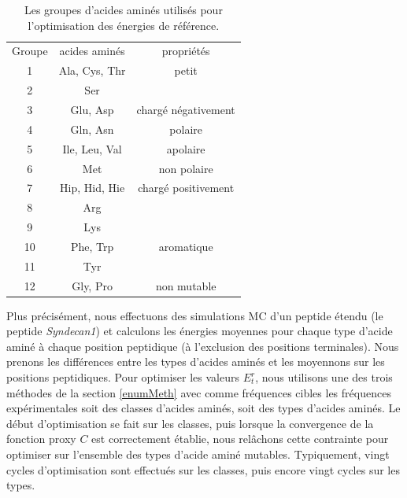     \begin{table}[!htbp]
      \centering

      \begin{tabular}{ccc}

        \toprule
        Groupe & acides aminés & propriétés\\
        \cmidrule{1-3}

        1   & Ala, Cys, Thr & petit\\
        2   & Ser &\\
        \cmidrule{1-3}
        3   & Glu, Asp & chargé négativement\\
        \cmidrule{1-3}
        4   & Gln, Asn & polaire\\
        \cmidrule{1-3}
        5   & Ile, Leu, Val & apolaire\\
        \cmidrule{1-3}
        6   & Met & non polaire\\
        \cmidrule{1-3}
        7   & Hip, Hid, Hie & chargé positivement\\
        8   & Arg \\
        9   & Lys \\
        \cmidrule{1-3}
        10  & Phe, Trp & aromatique\\
        11  & Tyr \\
        \cmidrule{1-3}
        12  & Gly, Pro & non mutable\\
        \bottomrule


      \end{tabular}      
      \caption{Les groupes d'acides aminés utilisés pour l'optimisation des énergies de référence.}
\label{tab:AAgroups}      
    \end{table}
Plus précisément, nous effectuons des simulations MC d'un peptide étendu (le peptide \textit{Syndecan1}) et calculons les énergies moyennes pour chaque type d'acide aminé à chaque position peptidique (à l'exclusion des positions terminales). Nous prenons les différences entre les types d'acides aminés et les moyennons sur les positions peptidiques.
Pour optimiser les valeurs $E^r_t$, nous utilisons une des trois méthodes de la section \ref{enumMeth} avec comme fréquences cibles les fréquences expérimentales soit des classes d'acides aminés, soit des types d'acides aminés. Le  début d'optimisation se fait sur les classes, puis lorsque la convergence de la fonction proxy $C$ est correctement établie, nous relâchons cette contrainte pour optimiser sur l'ensemble des types d'acide aminé mutables. Typiquement, vingt cycles d'optimisation sont effectués sur les classes, puis encore vingt cycles sur les types.  

